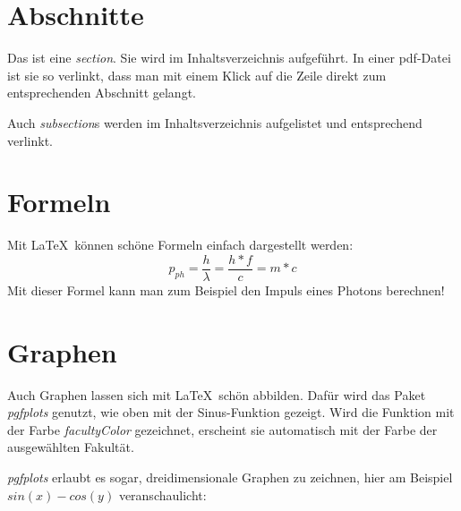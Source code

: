 \documentclass[a4paper]{uulm-document}
\begin{document}
\maketitle

\tableofcontents

\section{Abschnitte}
Das ist eine \textit{section}. Sie wird im Inhaltsverzeichnis aufgeführt. In einer pdf-Datei ist sie so verlinkt, dass man mit einem Klick auf die Zeile direkt zum entsprechenden Abschnitt gelangt.

Auch \textit{subsection}s werden im Inhaltsverzeichnis aufgelistet und entsprechend verlinkt.

\section{Formeln}
Mit \LaTeX\, können schöne Formeln einfach dargestellt werden:
\begin{equation}
p_{ph} = \frac{h}{\lambda} = \frac{h*f}{c} = m * c
\end{equation}
Mit dieser Formel kann man zum Beispiel den Impuls eines Photons berechnen!

\section{Graphen}
\begin{center}
\end{center}
Auch Graphen lassen sich mit \LaTeX\, schön abbilden. Dafür wird das Paket \textit{pgfplots} genutzt, wie oben mit der Sinus-Funktion gezeigt. Wird die Funktion mit der Farbe \textit{facultyColor} gezeichnet, erscheint sie automatisch mit der Farbe der ausgewählten Fakultät.

\textit{pgfplots} erlaubt es sogar, dreidimensionale Graphen zu zeichnen, hier am Beispiel $sin(x)-cos(y)$ veranschaulicht:
\begin{center}
\end{center}
\end{document}
